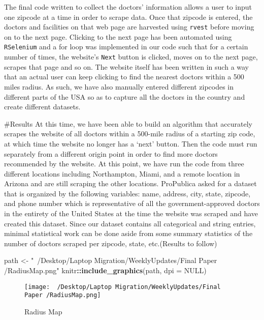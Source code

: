 \documentclass[10pt,letterpaper]{article}
\newenvironment{Shaded}{\begin{snugshade}}{\end{snugshade}}
\newcommand{\DataTypeTok}[1]{\textcolor[rgb]{0.13,0.29,0.53}{#1}}
\newcommand{\KeywordTok}[1]{\textcolor[rgb]{0.13,0.29,0.53}{\textbf{#1}}}
\newcommand{\NormalTok}[1]{#1}
\newcommand{\OperatorTok}[1]{\textcolor[rgb]{0.81,0.36,0.00}{\textbf{#1}}}
\newcommand{\OtherTok}[1]{\textcolor[rgb]{0.56,0.35,0.01}{#1}}
\newcommand{\StringTok}[1]{\textcolor[rgb]{0.31,0.60,0.02}{#1}}
\begin{document}
The final code written to collect the doctors' information allows a user
to input one zipcode at a time in order to scrape data. Once that
zipcode is entered, the doctors and facilities on that web page are
harvested using \texttt{rvest} before moving on to the next page.
Clicking to the next page has been automated using \texttt{RSelenium}
and a for loop was implemented in our code such that for a certain
number of times, the website's \texttt{Next} button is clicked, moves on
to the next page, scrapes that page and so on. The website itself has
been written in such a way that an actual user can keep clicking to find
the nearest doctors within a 500 miles radius. As such, we have also
manually entered different zipcodes in different parts of the USA so as
to capture all the doctors in the country and create different datasets.

\#Results At this time, we have been able to build an algorithm that
accurately scrapes the website of all doctors within a 500-mile radius
of a starting zip code, at which time the website no longer has a `next'
button. Then the code must run separately from a different origin point
in order to find more doctors recommended by the website. At this point,
we have run the code from three different locations including
Northampton, Miami, and a remote location in Arizona and are still
scraping the other locations. ProPublica asked for a dataset that is
organized by the following variables: name, address, city, state,
zipcode, and phone number which is representative of all the
government-approved doctors in the entirety of the United States at the
time the website was scraped and have created this dataset. Since our
dataset contains all categorical and string entries, minimal statistical
work can be done aside from some summary statistics of the number of
doctors scraped per zipcode, state, etc.(Results to follow)

\begin{Shaded}
\begin{Highlighting}[]
\NormalTok{path <-}\StringTok{ "~/Desktop/Laptop Migration/WeeklyUpdates/Final Paper /RadiusMap.png"}
\NormalTok{knitr}\OperatorTok{::}\KeywordTok{include_graphics}\NormalTok{(path, }\DataTypeTok{dpi =} \OtherTok{NULL}\NormalTok{)}
\end{Highlighting}
\end{Shaded}

\begin{figure}
\centering
\texttt{[image: ~/Desktop/Laptop Migration/WeeklyUpdates/Final Paper /RadiusMap.png]}
\caption{Radius Map}
\end{figure}
\end{document}
